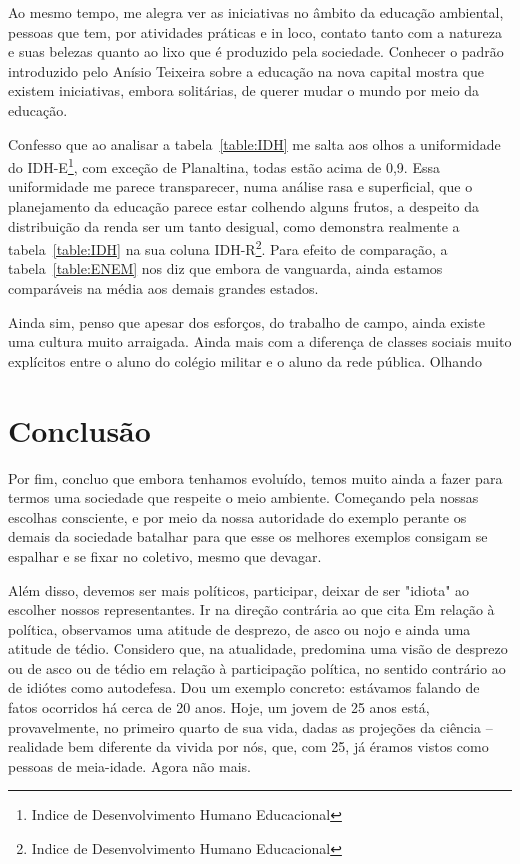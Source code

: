 Ao mesmo tempo, me alegra ver as iniciativas no âmbito da educação ambiental, pessoas que tem, por atividades práticas e in loco, contato tanto com a natureza e suas belezas quanto ao lixo que é produzido pela sociedade.
Conhecer o padrão introduzido pelo Anísio Teixeira sobre a educação na nova capital mostra que existem iniciativas, embora solitárias, de querer mudar o mundo por meio da educação.

Confesso que ao analisar a tabela~\ref{table:IDH} me salta aos olhos a uniformidade do IDH-E\footnote{Indice de Desenvolvimento Humano Educacional}, com exceção de Planaltina, todas estão acima de 0,9.
Essa uniformidade me parece transparecer, numa análise rasa e superficial, que o planejamento da educação parece estar colhendo alguns frutos, a despeito da distribuição da renda ser um tanto desigual, como demonstra realmente a tabela~\ref{table:IDH} na sua coluna IDH-R\footnote{Indice de Desenvolvimento Humano Educacional}.
Para efeito de comparação, a tabela~\ref{table:ENEM} nos diz que embora de vanguarda, ainda estamos comparáveis na média aos demais grandes estados.

Ainda sim, penso que apesar dos esforços, do trabalho de campo, ainda existe uma cultura muito arraigada. Ainda mais com a diferença de classes sociais muito explícitos entre o aluno do colégio militar e o aluno da rede pública. Olhando



\section{Conclusão}

Por fim, concluo que embora tenhamos evoluído, temos muito ainda a fazer para termos uma sociedade que respeite o meio ambiente. Começando pela nossas escolhas consciente, e por meio da nossa autoridade do exemplo perante os demais da sociedade batalhar para que esse os melhores exemplos consigam se espalhar e se fixar no coletivo, mesmo que devagar.

Além disso, devemos ser mais políticos, participar, deixar de ser "idiota" ao escolher nossos representantes. Ir na direção contrária ao que cita  Em relação à
política, observamos uma atitude de desprezo, de asco ou nojo e ainda uma
atitude de tédio. Considero que, na atualidade, predomina uma visão de
desprezo ou de asco ou de tédio em relação à participação política, no sentido
contrário ao de idiótes como autodefesa. Dou um exemplo concreto: estávamos
falando de fatos ocorridos há cerca de 20 anos. Hoje, um jovem de 25 anos
está, provavelmente, no primeiro quarto de sua vida, dadas as projeções da
ciência – realidade bem diferente da vivida por nós, que, com 25, já éramos
vistos como pessoas de meia-idade. Agora não mais.

